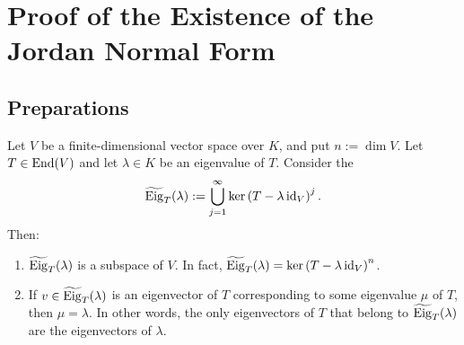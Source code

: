 %
\renewcommand{\thetheorem}{28.b.\arabic{theorem}}
\setcounter{theorem}{0}
%

\section{Proof of the Existence of the Jordan Normal Form}

\subsection{Preparations}

\begin{lemma}
\label{lem:generalized_eigenspace}
Let $V$ be a finite-di\-men\-sional vector space over $K$, and put $n := \dim V$. Let $T \in \operatorname{End}(V)$ and let $\lambda \in K$ be an eigenvalue of $T$. Consider the 
\[
    \widetilde{\operatorname{Eig}}_T(\lambda) := \bigcup_{j=1}^{\infty} \ker\left(T - \lambda \operatorname{id}_V\right)^j.
\]
Then:
\begin{enumerate}[label=\textbf{(\alph*)}]
    \item $\widetilde{\operatorname{Eig}}_T(\lambda)$ is a subspace of $V$. In fact, $\widetilde{\operatorname{Eig}}_T(\lambda) = \ker\left(T - \lambda \operatorname{id}_V\right)^n$.
    \item If $v \in \widetilde{\operatorname{Eig}}_T(\lambda)$ is an eigenvector of $T$ corresponding to some eigenvalue $\mu$ of $T$, then $\mu = \lambda$. In other words, the only eigenvectors of $T$ that belong to $\widetilde{\operatorname{Eig}}_T(\lambda)$ are the eigenvectors of $\lambda$.
\end{enumerate}
\end{lemma}

